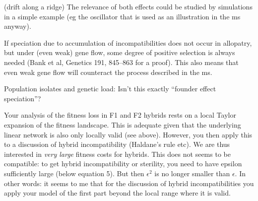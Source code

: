 
\begin{point}{(drift along a ridge)}
    The relevance of both effects could be studied by simulations in a simple
example (eg the oscillator that is used as an illustration in the ms anyway).
\end{point}


\begin{point}{}
    If speciation due to accumulation of incompatibilities does not occur in
allopatry, but under (even weak) gene flow, some degree of positive selection
is always needed (Bank et al, Genetics 191, 845–863 for a proof). This also
means that even weak gene flow will counteract the process described in the ms.
\end{point}


\begin{point}{}
    Population isolates and genetic load: Isn't this exactly ``founder effect
speciation''?
\end{point}


\begin{point}{}
    Your analysis of the fitness loss in F1 and F2 hybrids rests on a local
Taylor expansion of the fitness landscape. This is adequate given that the
underlying linear network is also only locally valid (see above). However, you
then apply this to a discussion of hybrid incompatibility (Haldane's rule etc).
We are thus interested in \emph{very large} fitness costs for hybrids. This does not
seems to be compatible: to get hybrid incompatibility or sterility, you need to
have epsilon sufficiently large (below equation 5). But then $\epsilon^2$ is no
longer smaller than $\epsilon$. In other words: it seems to me that for the
discussion of hybrid incompatibilities you apply your model of the first part
beyond the local range where it is valid.
\end{point}



